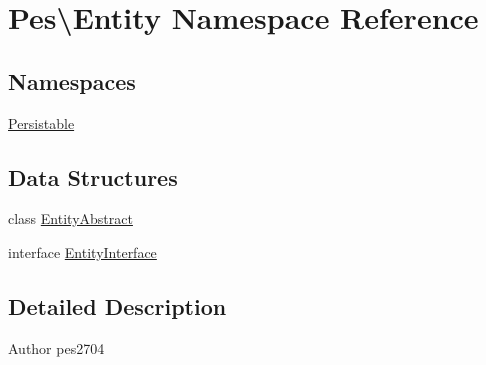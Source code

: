 \hypertarget{namespace_pes_1_1_entity}{}\section{Pes\textbackslash{}Entity Namespace Reference}
\label{namespace_pes_1_1_entity}
\subsection*{Namespaces}
\begin{DoxyCompactItemize}
\item 
 \mbox{\hyperlink{namespace_pes_1_1_entity_1_1_persistable}{Persistable}}
\end{DoxyCompactItemize}
\subsection*{Data Structures}
\begin{DoxyCompactItemize}
\item 
class \mbox{\hyperlink{class_pes_1_1_entity_1_1_entity_abstract}{Entity\+Abstract}}
\item 
interface \mbox{\hyperlink{interface_pes_1_1_entity_1_1_entity_interface}{Entity\+Interface}}
\end{DoxyCompactItemize}


\subsection{Detailed Description}
\begin{DoxyAuthor}{Author}
pes2704 
\end{DoxyAuthor}
